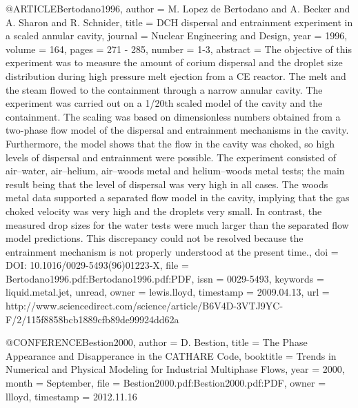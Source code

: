 @ARTICLE{Bertodano1996,
  author = {M. Lopez de Bertodano and A. Becker and A. Sharon and R. Schnider},
  title = {DCH dispersal and entrainment experiment in a scaled annular cavity},
  journal = {Nuclear Engineering and Design},
  year = {1996},
  volume = {164},
  pages = {271 - 285},
  number = {1-3},
  abstract = {The objective of this experiment was to measure the amount of corium
	dispersal and the droplet size distribution during high pressure
	melt ejection from a CE reactor. The melt and the steam flowed to
	the containment through a narrow annular cavity. The experiment was
	carried out on a 1/20th scaled model of the cavity and the containment.
	The scaling was based on dimensionless numbers obtained from a two-phase
	flow model of the dispersal and entrainment mechanisms in the cavity.
	Furthermore, the model shows that the flow in the cavity was choked,
	so high levels of dispersal and entrainment were possible. The experiment
	consisted of air--water, air--helium, air--woods metal and helium--woods
	metal tests; the main result being that the level of dispersal was
	very high in all cases. The woods metal data supported a separated
	flow model in the cavity, implying that the gas choked velocity was
	very high and the droplets very small. In contrast, the measured
	drop sizes for the water tests were much larger than the separated
	flow model predictions. This discrepancy could not be resolved because
	the entrainment mechanism is not properly understood at the present
	time.},
  doi = {DOI: 10.1016/0029-5493(96)01223-X},
  file = {Bertodano1996.pdf:Bertodano1996.pdf:PDF},
  issn = {0029-5493},
  keywords = {liquid.metal.jet, unread},
  owner = {lewis.lloyd},
  timestamp = {2009.04.13},
  url = {http://www.sciencedirect.com/science/article/B6V4D-3VTJ9YC-F/2/115f8858bcb1889cfb89de99924dd62a}
}

@CONFERENCE{Bestion2000,
  author = {D. Bestion},
  title = {The Phase Appearance and Disapperance in the {CATHARE} Code},
  booktitle = {Trends in Numerical and Physical Modeling for Industrial Multiphase
	Flows},
  year = {2000},
  month = {September},
  file = {Bestion2000.pdf:Bestion2000.pdf:PDF},
  owner = {llloyd},
  timestamp = {2012.11.16}
}

